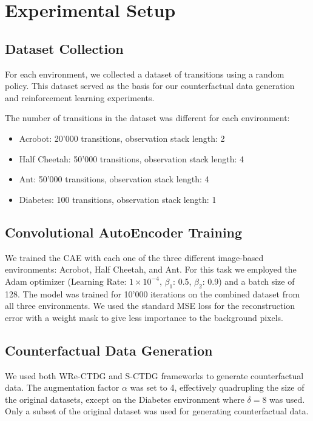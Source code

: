 \section{Experimental Setup}

\subsection{Dataset Collection}

For each environment, we collected a dataset of transitions using a random policy.
This dataset served as the basis for our counterfactual
data generation and reinforcement learning experiments.

The number of transitions in the dataset was different for each environment:
\begin{itemize}
    \item Acrobot: 20'000 transitions, observation stack length: 2
    \item Half Cheetah: 50'000 transitions, observation stack length: 4
    \item Ant: 50'000 transitions, observation stack length: 4
    \item Diabetes: 100 transitions, observation stack length: 1
\end{itemize} 

\subsection{Convolutional AutoEncoder Training}

We trained the CAE with each one of the three different image-based
environments: Acrobot, Half Cheetah, and Ant.
For this task we employed the Adam optimizer
(Learning Rate: $1\times 10^{-4}$, $\beta_1$: 0.5, $\beta_2$: 0.9)
and a batch size of 128. The model was trained for 10'000 iterations
on the combined dataset from all three environments. We used the standard
MSE loss for the reconstruction error with a weight mask
to give less importance to the background pixels.

\subsection{Counterfactual Data Generation}

We used both WRe-CTDG and S-CTDG frameworks to generate counterfactual data.
The augmentation factor $\alpha$ was set to 4, effectively quadrupling
the size of the original datasets,
except on the Diabetes environment where $\delta = 8$ was used.
Only a subset of the original dataset
was used for generating counterfactual data.

